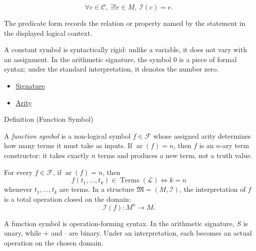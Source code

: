 \begin{remark*}
\[
  \forall c\in\mathcal{C},\ \exists! e\in M,\ \mathcal{I}(c)=e.
\]

The predicate form records the relation or property named by the statement in
the displayed logical context.
\end{remark*}


\begin{remark*}[Interpretation]
A constant symbol is syntactically rigid: unlike a variable, it does not vary
with an assignment. In the arithmetic signature, the symbol $0$ is a piece of
formal syntax; under the standard interpretation, it denotes the number zero.
\end{remark*}

\begin{dependencies}
\begin{itemize}
  \item \hyperref[def:signature]{Signature}
  \item \hyperref[def:arity]{Arity}
\end{itemize}
\end{dependencies}

\begin{definitionbox}{Definition (Function Symbol)}
\begin{definition}
\label{def:signature-function-symbol}
A \emph{function symbol} is a non-logical symbol $f\in\mathcal{F}$ whose
assigned arity determines how many terms it must take as inputs. If
$\operatorname{ar}(f)=n$, then $f$ is an $n$-ary term constructor: it takes
exactly $n$ terms and produces a new term, not a truth value.
\end{definition}
\end{definitionbox}

\begin{remark*}
For every $f\in\mathcal{F}$, if $\operatorname{ar}(f)=n$, then
\[
  f(t_1,\ldots,t_k)\in\operatorname{Terms}(\mathcal{L})
  \iff k=n
\]
whenever $t_1,\ldots,t_k$ are terms. In a structure
$\mathfrak{M}=(M,\mathcal{I})$, the interpretation of $f$ is a total operation
closed on the domain:
\[
  \mathcal{I}(f):M^n\to M.
\]
\end{remark*}

\begin{remark*}[Interpretation]
A function symbol is operation-forming syntax. In the arithmetic signature,
$S$ is unary, while $+$ and $\cdot$ are binary. Under an interpretation, each
becomes an actual operation on the chosen domain.
\end{remark*}


